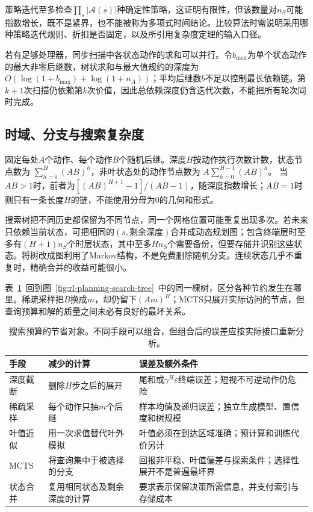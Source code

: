 策略迭代至多检查$\prod_s|\mathcal A(s)|$种确定性策略，这证明有限性，但该数量对$n_S$可能指数增长，既不是紧界，也不能被称为多项式时间结论。比较算法时需说明采用哪种策略迭代规则、折扣是否固定，以及所引用复杂度定理的输入口径。

若有足够处理器，同步扫描中各状态动作的求和可以并行。令$b_{\max}$为单个状态动作的最大非零后继数，树状求和与最大值规约的深度为$O(\log(1+b_{\max})+\log(1+n_A))$；平均后继数$b$不足以控制最长依赖链。第$k+1$次扫描仍依赖第$k$次价值，因此总依赖深度仍含迭代次数，不能把所有轮次同时完成。

\subsection{时域、分支与搜索复杂度}
\label{sec:rl-planning-search-complexity}

固定每处$A$个动作、每个动作$B$个随机后继。深度$H$按动作执行次数计数，状态节点数为
$\sum_{h=0}^{H}(AB)^h$，非叶状态处的动作节点数为
$A\sum_{h=0}^{H-1}(AB)^h$。
当$AB>1$时，前者为$[(AB)^{H+1}-1]/(AB-1)$，随深度指数增长；$AB=1$时则只有一条长度$H$的链，不能使用分母为0的几何和形式。

搜索树把不同历史都保留为不同节点，同一个网格位置可能重复出现多次。若未来只依赖当前状态，可把相同的$(s,\text{剩余深度})$合并成动态规划图；包含终端层时至多有$(H+1)n_S$个时层状态，其中至多$Hn_S$个需要备份，但要存储并识别这些状态。将树改成图利用了Markov结构，不是免费删除随机分支。连续状态几乎不重复时，精确合并的收益可能很小。

表~\ref{tab:rl-planning-search-costs}~回到图~\ref{fig:rl-planning-search-tree}~中的同一棵树，区分各种节约发生在哪里。稀疏采样把$B$换成$m$，却仍留下$(Am)^H$；MCTS只展开实际访问的节点，但查询预算和解的质量之间未必有良好的最坏关系。

\begin{table}[htbp]
 \centering
 \small
 \begin{tabularx}{\linewidth}{@{}l>{\raggedright\arraybackslash}X>{\raggedright\arraybackslash}X@{}}
  \toprule
  手段 & 减少的计算 & 误差及额外条件\\
  \midrule
  深度截断 & 删除$H$步之后的展开 & 尾和或$\gamma^H\varepsilon$终端误差；短视不可逆动作仍危险\\
  稀疏采样 & 每个动作只抽$m$个后继 & 样本均值及递归误差；独立生成模型、置信度和树规模\\
  叶值近似 & 用一次求值替代叶外模拟 & 叶值必须在到达区域准确；预计算和训练代价另计\\
  MCTS & 将查询集中于被选择的分支 & 回报非平稳、叶值偏差与探索条件；选择性展开不是普遍最坏界\\
  状态合并 & 复用相同状态及剩余深度的计算 & 要求表示保留决策所需信息，并支付索引与存储成本\\
  \bottomrule
 \end{tabularx}
 \caption{搜索预算的节省对象。不同手段可以组合，但组合后的误差应按实际接口重新分析。}
 \label{tab:rl-planning-search-costs}
\end{table}

